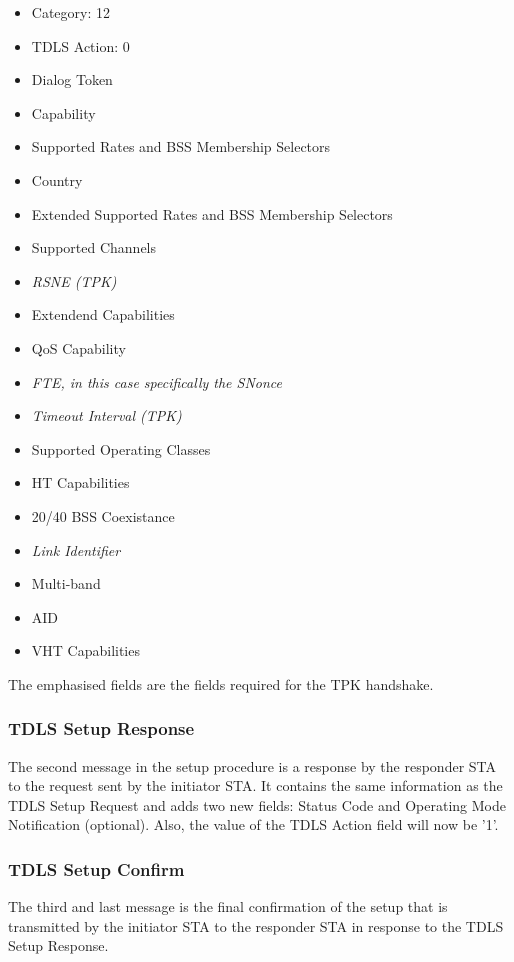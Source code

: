 \begin{itemize}
	\item Category: 12
	\item TDLS Action: 0
	\item Dialog Token
	\item Capability
	\item Supported Rates and BSS Membership Selectors
	\item Country
	\item Extended Supported Rates and BSS Membership Selectors
	\item Supported Channels
	\item \emph{RSNE (TPK)}
	\item Extendend Capabilities
	\item QoS Capability
	\item \emph{FTE, in this case specifically the SNonce}
	\item \emph{Timeout Interval (TPK)}
	\item Supported Operating Classes
	\item HT Capabilities
	\item 20/40 BSS Coexistance
	\item \emph{Link Identifier}
	\item Multi-band
	\item AID
	\item VHT Capabilities
\end{itemize} 

The emphasised fields are the fields required for the TPK handshake.

\subsubsection{TDLS Setup Response}

The second message in the setup procedure is a response by the responder STA to the request sent by the initiator STA. It contains the same information as the TDLS Setup Request and adds two new fields: Status Code and Operating Mode Notification (optional). Also, the value of the TDLS Action field will now be '1'.

\subsubsection{TDLS Setup Confirm}

The third and last message is the final confirmation of the setup that is transmitted by the initiator STA to the responder STA in response to the TDLS Setup Response.

